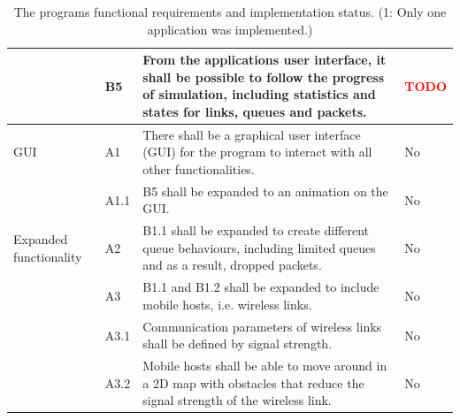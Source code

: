 \begin{table}[!htbp]
{\begin{tabular}{p{}|p{}|p{}|p{}}
& B5        & From the applications user interface, it shall be possible to follow the progress of simulation, including statistics and states for links, queues and packets. & \textcolor{red}{TODO} \\
\hline GUI
& A1        & There shall be a graphical user interface (GUI) for the program to interact with all other functionalities. & No\\
& A1.1      & B5 shall be expanded to an animation on the GUI. & No\\
\hline Expanded functionality
& A2        & B1.1 shall be expanded to create different queue behaviours, including limited queues and as a result, dropped packets. & No\\
& A3        & B1.1 and B1.2 shall be expanded to include mobile hosts, i.e. wireless links. & No\\
& A3.1      & Communication parameters of wireless links shall be defined by signal strength. & No\\
& A3.2      & Mobile hosts shall be able to move around in a 2D map with obstacles that reduce the signal strength of the wireless link. & No\\
\hline
\end{tabular}
}
\caption{The programs functional requirements and implementation status. (1: Only one application was implemented.) }
\label{table:requirements}
\end{table}

